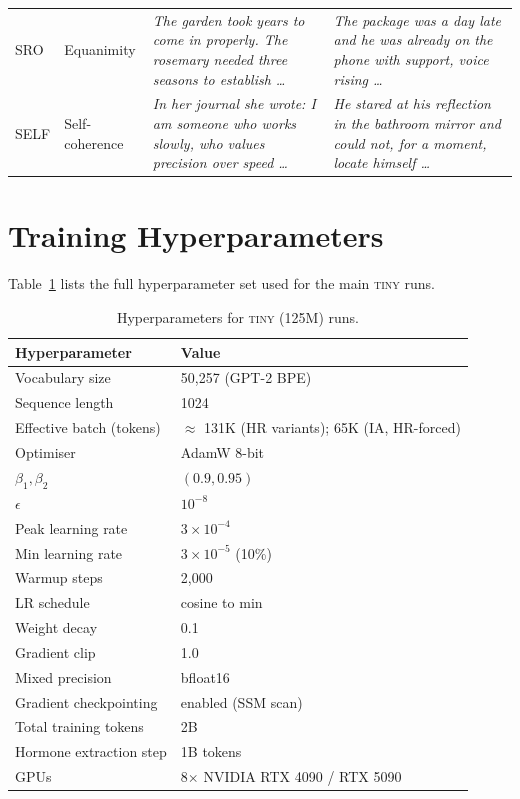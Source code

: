 \begin{table}[h]
\begin{tabular}{llp{3.6cm}p{3.6cm}}
SRO  & Equanimity     & \textit{The garden took years to come in properly. The rosemary needed three seasons to establish \ldots} & \textit{The package was a day late and he was already on the phone with support, voice rising \ldots} \\[4pt]
SELF & Self-coherence & \textit{In her journal she wrote: I am someone who works slowly, who values precision over speed \ldots} & \textit{He stared at his reflection in the bathroom mirror and could not, for a moment, locate himself \ldots} \\
\bottomrule
\end{tabular}
\end{table}

\section{Training Hyperparameters}
\label{app:hyperparams}

Table~\ref{tab:hparams} lists the full hyperparameter set used for the main \textsc{tiny} runs.

\begin{table}[h]
\centering
\caption{Hyperparameters for \textsc{tiny} (125M) runs.}
\label{tab:hparams}
\begin{tabular}{ll}
\toprule
Hyperparameter & Value \\
\midrule
Vocabulary size            & 50{,}257 (GPT-2 BPE) \\
Sequence length            & 1024 \\
Effective batch (tokens)   & $\approx$ 131K (HR variants); 65K (IA, HR-forced) \\
Optimiser                  & AdamW 8-bit \\
$\beta_1, \beta_2$         & $(0.9, 0.95)$ \\
$\epsilon$                 & $10^{-8}$ \\
Peak learning rate         & $3\times 10^{-4}$ \\
Min learning rate          & $3\times 10^{-5}$ (10\%) \\
Warmup steps               & 2{,}000 \\
LR schedule                & cosine to min \\
Weight decay               & 0.1 \\
Gradient clip              & 1.0 \\
Mixed precision            & bfloat16 \\
Gradient checkpointing     & enabled (SSM scan) \\
Total training tokens      & 2B \\
Hormone extraction step    & 1B tokens \\
GPUs                       & 8$\times$ NVIDIA RTX 4090 / RTX 5090 \\
\bottomrule
\end{tabular}
\end{table}

